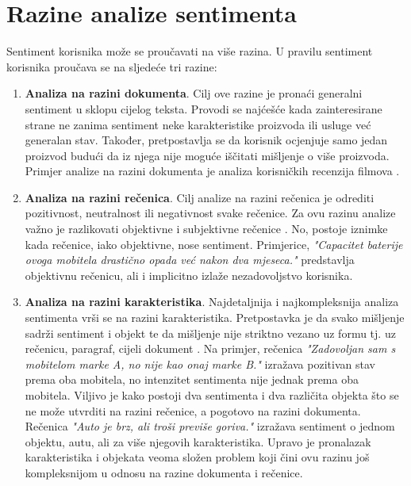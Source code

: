 \documentclass[times, utf8, zavrsni, numeric]{fer}
\begin{document}
\section{Razine analize sentimenta} \label{sarazine}
Sentiment korisnika može se proučavati na više razina.
U pravilu sentiment korisnika proučava se na sljedeće tri razine:

\begin{enumerate}
  \item \textbf{Analiza na razini dokumenta}. 
  Cilj ove razine je pronaći generalni sentiment u sklopu cijelog teksta. 
  Provodi se najćešće kada zainteresirane strane ne zanima sentiment neke karakteristike proizvoda
  ili usluge već generalan stav.
  Također, pretpostavlja se da korisnik ocjenjuje samo jedan proizvod budući da iz njega nije moguće
  iščitati mišljenje o više proizvoda.
  Primjer analize na razini dokumenta je analiza korisničkih recenzija filmova 
  \cite{Pang+Lee+Vaithyanathan:02a}.

  \item \textbf{Analiza na razini rečenica}.
  Cilj analize na razini rečenica je odrediti pozitivnost, neutralnost ili negativnost svake rečenice.
  Za ovu razinu analize važno je razlikovati objektivne i subjektivne rečenice 
  \cite{wiebe-bruce-o'hara:1999:ACL}.
  No, postoje iznimke kada rečenice, iako objektivne, nose sentiment.
  Primjerice, \textit{"Capacitet baterije ovoga mobitela drastično opada već nakon dva mjeseca."}
  predstavlja objektivnu rečenicu, ali i implicitno izlaže nezadovoljstvo korisnika.

  \item \textbf{Analiza na razini karakteristika}.
  Najdetaljnija i najkompleksnija analiza sentimenta vrši se na razini karakteristika.
  Pretpostavka je da svako mišljenje sadrži sentiment i objekt te da mišljenje nije striktno vezano
  uz formu tj. uz rečenicu, paragraf, cijeli dokument \cite{Hu:2004:MSC:1014052.1014073}.
  Na primjer, rečenica \textit{"Zadovoljan sam s mobitelom marke A, no nije kao onaj marke B."}
  izražava pozitivan stav prema oba mobitela, no intenzitet sentimenta nije jednak prema oba mobitela.
  Viljivo je kako postoji dva sentimenta i dva različita objekta što se ne može utvrditi na razini rečenice,
  a pogotovo na razini dokumenta.
  Rečenica \textit{"Auto je brz, ali troši previše goriva."} izražava sentiment o jednom objektu, autu, 
  ali za više njegovih karakteristika.
  Upravo je pronalazak karakteristika i objekata veoma složen problem koji čini ovu razinu još kompleksnijom
  u odnosu na razine dokumenta i rečenice. 
\end{enumerate}
\end{document}
